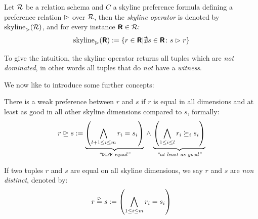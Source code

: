 
\begin{definition}
\label{def:skyline}
Let $\mathcal{R}$ be a relation schema and $C$ a skyline preference
formula defining a preference relation $\vartriangleright$ over $\mathcal{R}$,
then the \emph{skyline operator} is denoted by
$\skyline_\dominates(\schema R)$, and for every instance $\textnormal{\bf\textsf{R}}
\in \mathcal{R}$:
\[
\skyline_\dominates(\relation{R}) := \{ r \in \relation{R} | \nexists
s \in \relation{R}\colon s \dominates r \}
\]
\end{definition}

To give the intuition, the skyline operator returns all tuples which
are \emph{not dominated}, in other words all tuples that do \emph{not}
have a \emph{witness}.

\bigskip
\noindent
We now like to introduce some further concepts:

\begin{definition}
There is a weak preference between $r$ and $s$ if $r$ is equal in all
 dimensions and at least as good in all other skyline
dimensions compared to $s$, formally:
\emph{
\begin{equation}
r \trianglerighteq s :=
\underbrace{\left( \bigwedge_{l+1 \le i \le m} r_i = s_i \right)}_{\textit{``\/}\texttt{DIFF}\textit{ equal''}} \,\land\,
\underbrace{\left( \bigwedge_{1 \le i \le l} r_i \succeq_i s_i \right)}_{\textit{``at least as good''}}
\end{equation}
}
\end{definition}

\begin{definition}
If two tuples $r$ and $s$ are equal on all skyline dimensions, we say $r$ and $s$
are \emph{non distinct}, denoted by:
\begin{equation}\label{eqn:nondistinct}
r \stackrel{\vartriangleright}{=} s := \left( \bigwedge_{1 \le i \le m} r_i = s_i \right)
\end{equation}
\end{definition}

